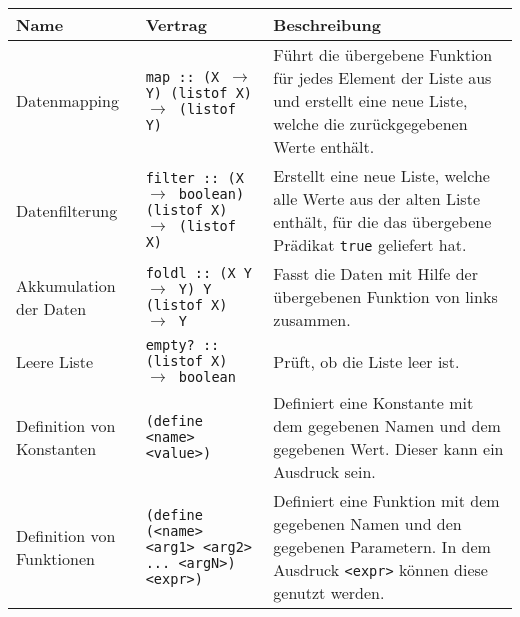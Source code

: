 \begin{sidewaystable}
	\centering
	\begin{tabular}{p{5cm} | p{7cm} | p{9cm}}
		Name                                                              & Vertrag                                                                                                        & Beschreibung                                                                                                                                                  \\
		\hline
		Datenmapping                                                      & \texttt{map :: (X $ \rightarrow $ Y) (listof X) $ \rightarrow $ (listof Y)}                                    & Führt die übergebene Funktion für jedes Element der Liste aus und erstellt eine neue Liste, welche die zurückgegebenen Werte enthält.                         \\
		Datenfilterung                                                    & \texttt{filter :: (X $ \rightarrow $ boolean) (listof X) $ \rightarrow $ (listof X)}                           & Erstellt eine neue Liste, welche alle Werte aus der alten Liste enthält, für die das übergebene Prädikat \texttt{true} geliefert hat.                         \\
		Akkumulation der Daten                                            & \texttt{foldl :: (X Y $ \rightarrow $ Y) Y (listof X) $ \rightarrow $ Y}                                       & Fasst die Daten mit Hilfe der übergebenen Funktion von links zusammen.                                                                                        \\
		Leere Liste                                                       & \texttt{empty? :: (listof X) $ \rightarrow $ boolean}                                                          & Prüft, ob die Liste leer ist.                                                                                                                                 \\
		\hline
		Definition von Konstanten                                         & \texttt{(define <name> <value>)}                                                                               & Definiert eine Konstante mit dem gegebenen Namen und dem gegebenen Wert. Dieser kann ein Ausdruck sein.                                                       \\
		Definition von Funktionen                                         & \texttt{(define (<name> <arg1> <arg2> ... <argN>) <expr>)}                                                     & Definiert eine Funktion mit dem gegebenen Namen und den gegebenen Parametern. In dem Ausdruck \texttt{<expr>} können diese genutzt werden.                    \\

\end{tabular}
\end{sidewaystable}
